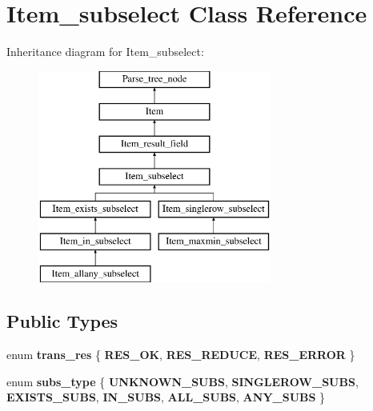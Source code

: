 \hypertarget{classItem__subselect}{}\section{Item\+\_\+subselect Class Reference}
\label{classItem__subselect}
Inheritance diagram for Item\+\_\+subselect\+:\begin{figure}[H]
\begin{center}
\leavevmode
\includegraphics[height=7.000000cm]{classItem__subselect}
\end{center}
\end{figure}
\subsection*{Public Types}
\begin{DoxyCompactItemize}
\item 
\mbox{\label{classItem__subselect_aebfb78eb783ba77b9d6cff076513ac16}} 
enum {\bfseries trans\+\_\+res} \{ {\bfseries R\+E\+S\+\_\+\+OK}, 
{\bfseries R\+E\+S\+\_\+\+R\+E\+D\+U\+CE}, 
{\bfseries R\+E\+S\+\_\+\+E\+R\+R\+OR}
 \}
\item 
\mbox{\label{classItem__subselect_a1d3f5245246e370c6420309fe8daafc5}} 
enum {\bfseries subs\+\_\+type} \{ \newline
{\bfseries U\+N\+K\+N\+O\+W\+N\+\_\+\+S\+U\+BS}, 
{\bfseries S\+I\+N\+G\+L\+E\+R\+O\+W\+\_\+\+S\+U\+BS}, 
{\bfseries E\+X\+I\+S\+T\+S\+\_\+\+S\+U\+BS}, 
{\bfseries I\+N\+\_\+\+S\+U\+BS}, 
\newline
{\bfseries A\+L\+L\+\_\+\+S\+U\+BS}, 
{\bfseries A\+N\+Y\+\_\+\+S\+U\+BS}
 \}
\end{DoxyCompactItemize}

